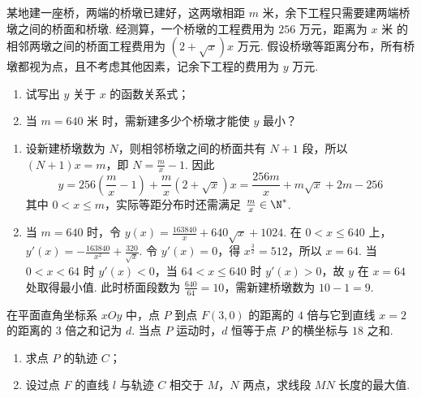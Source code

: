 \begin{problem}
某地建一座桥，两端的桥墩已建好，这两墩相距 \(m\text{ 米}\)，余下工程只需要建两端桥墩之间的桥面和桥墩. 经测算，一个桥墩的工程费用为 \(256\text{ 万元}\)，距离为 \(x\text{ 米}\) 的相邻两墩之间的桥面工程费用为 \((2 + \sqrt{x})x\text{ 万元}\). 假设桥墩等距离分布，所有桥墩都视为点，且不考虑其他因素，记余下工程的费用为 \(y\text{ 万元}\).
\begin{enumerate}
\item 试写出 \(y\) 关于 \(x\) 的函数关系式；
\item 当 \(m = 640\text{ 米}\) 时，需新建多少个桥墩才能使 \(y\) 最小？
\end{enumerate}
\end{problem}

\begin{solution}
\begin{enumerate}
\item 设新建桥墩数为 \(N\)，则相邻桥墩之间的桥面共有 \(N+1\) 段，所以 \((N+1)x=m\)，即 \(N=\frac mx-1\). 因此
\[
y=256\left(\frac mx-1\right)+\frac mx(2+\sqrt{x})x=\frac{256m}{x}+m\sqrt{x}+2m-256
\]
其中 \(0<x\leqslant m\)，实际等距分布时还需满足 \(\frac mx\in\N^*\).
\item 当 \(m=640\) 时，令 \(y(x)=\frac{163840}{x}+640\sqrt{x}+1024\). 在 \(0<x\leqslant640\) 上，\(y'(x)=-\frac{163840}{x^2}+\frac{320}{\sqrt{x}}\). 令 \(y'(x)=0\)，得 \(x^{\frac{3}{2}}=512\)，所以 \(x=64\). 当 \(0<x<64\) 时 \(y'(x)<0\)，当 \(64<x\leqslant640\) 时 \(y'(x)>0\)，故 \(y\) 在 \(x=64\) 处取得最小值. 此时桥面段数为 \(\frac{640}{64}=10\)，需新建桥墩数为 \(10-1=9\).
\end{enumerate}
\end{solution}

\begin{problem}
在平面直角坐标系 \(xOy\) 中，点 \(P\) 到点 \(F(3,0)\) 的距离的 \(4\) 倍与它到直线 \(x = 2\) 的距离的 \(3\) 倍之和记为 \(d\). 当点 \(P\) 运动时，\(d\) 恒等于点 \(P\) 的横坐标与 \(18\) 之和.
\begin{enumerate}
\item 求点 \(P\) 的轨迹 \(C\)；
\item 设过点 \(F\) 的直线 \(l\) 与轨迹 \(C\) 相交于 \(M\)，\(N\) 两点，求线段 \(MN\) 长度的最大值.
\end{enumerate}
\end{problem}

